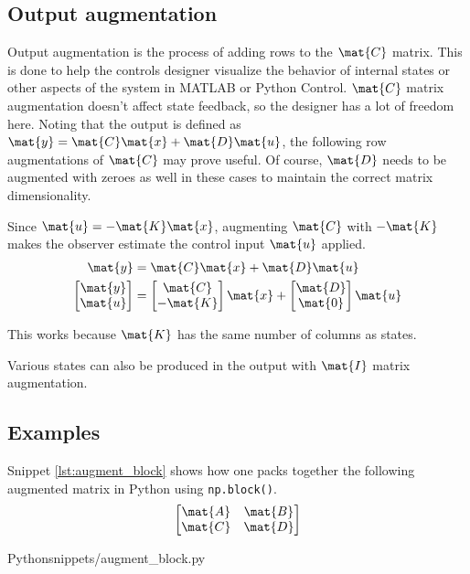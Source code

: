 \subsection{Output augmentation}

Output augmentation is the process of adding rows to the $\mat{C}$ matrix. This
is done to help the controls designer visualize the behavior of internal states
or other aspects of the \gls{system} in MATLAB or Python Control. $\mat{C}$
matrix augmentation doesn't affect \gls{state} feedback, so the designer has a
lot of freedom here. Noting that the \gls{output} is defined as
$\mat{y} = \mat{C}\mat{x} + \mat{D}\mat{u}$, the following row augmentations of
$\mat{C}$ may prove useful. Of course, $\mat{D}$ needs to be augmented with
zeroes as well in these cases to maintain the correct matrix dimensionality.

Since $\mat{u} = -\mat{K}\mat{x}$, augmenting $\mat{C}$ with $-\mat{K}$ makes
the \gls{observer} estimate the \gls{control input} $\mat{u}$ applied.
\begin{align*}
  \mat{y} &= \mat{C}\mat{x} + \mat{D}\mat{u} \\
  \begin{bmatrix}
    \mat{y} \\
    \mat{u}
  \end{bmatrix} &=
  \begin{bmatrix}
    \mat{C} \\
    -\mat{K}
  \end{bmatrix}
  \mat{x} +
  \begin{bmatrix}
    \mat{D} \\
    \mat{0}
  \end{bmatrix}
  \mat{u}
\end{align*}

This works because $\mat{K}$ has the same number of columns as \glspl{state}.

Various \glspl{state} can also be produced in the \gls{output} with $\mat{I}$
matrix augmentation.

\subsection{Examples}

Snippet \ref{lst:augment_block} shows how one packs together the following
augmented matrix in Python using \texttt{np.block()}.
\begin{equation*}
  \begin{bmatrix}
    \mat{A} & \mat{B} \\
    \mat{C} & \mat{D}
  \end{bmatrix}
\end{equation*}
\begin{code}{Python}{snippets/augment_block.py}
  \caption{Matrix augmentation example: block}
  \label{lst:augment_block}
\end{code}

